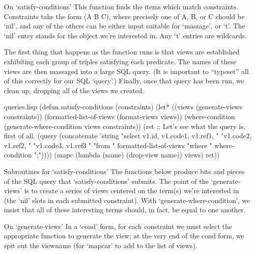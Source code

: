\begin{notate}{On `satisfy-conditions'} \label{satisfy-conditions}
This function finds the items which match constraints.
Constraints take the form (A B C), where precisely one of
A, B, or C should be `nil', and any of the others can be
either input suitable for `massage', or
`t'.  The `nil' entry stands for the object we're
interested in.  Any `t' entries are wildcards.

The first thing that happens as the function runs is that
views are established exhibiting each group of triples
satisfying each predicate.  The names of these views are
then massaged into a large SQL query.  (It is important to
``typeset'' all of this correctly for our SQL `query'.)
Finally, once that query has been run, we clean up,
dropping all of the views we created.
\end{notate}

\begin{common}{queries.lisp}
(defun satisfy-conditions (constraints)
  (let* ((views (generate-views constraints))
         (formatted-list-of-views (format-views
                                   views))
         (where-condition (generate-where-condition
                           views
                           constraints))
         (ret
          ;; Let's see what the query is, first of all.
          (query
           (concatenate
            'string
            "select v1.id, v1.code1, v1.ref1, "
                          "v1.code2, v1.ref2, "
                          "v1.code3, v1.ref3 "
            "from "
            formatted-list-of-views
            "where "
            where-condition
            ";"))))
    (mapc (lambda (name) (drop-view name)) views)
    ret))
\end{common}

\begin{notate}{Subroutines for `satisfy-conditions'}
The functions below produce bits and pieces of the SQL
query that `satisfy-conditions' submits.  The point of the
`generate-views' is to create a series of views centered
on the term(s) we're interested in (the `nil' slots in
each submitted constraint).  With
`generate-where-condition', we insist that all of these
interesting terms should, in fact, be equal to one
another.
\end{notate}

\begin{notate}{On `generate-views'}
In a `cond' form, for each constraint we must select the
appropriate function to generate the view; at the very end
of the cond form, we spit out the viewname (for `mapcar'
to add to the list of views).
\end{notate}

